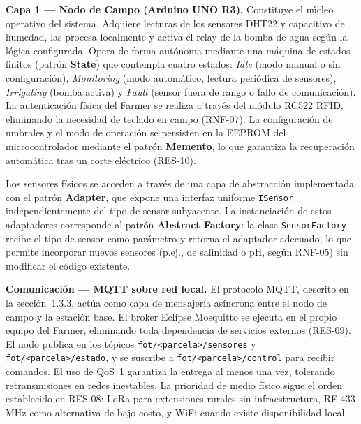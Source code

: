 \noindent\textbf{Capa 1 — Nodo de Campo (Arduino UNO R3).} Constituye el
núcleo operativo del sistema. Adquiere lecturas de los sensores DHT22 y
capacitivo de humedad, las procesa localmente y activa el relay de la bomba
de agua según la lógica configurada. Opera de forma autónoma mediante una
máquina de estados finitos (patrón \textbf{State}) que contempla cuatro
estados: \textit{Idle} (modo manual o sin configuración), \textit{Monitoring}
(modo automático, lectura periódica de sensores), \textit{Irrigating} (bomba
activa) y \textit{Fault} (sensor fuera de rango o fallo de comunicación).
La autenticación física del Farmer se realiza a través del módulo RC522
RFID, eliminando la necesidad de teclado en campo (RNF-07). La configuración
de umbrales y el modo de operación se persisten en la EEPROM del
microcontrolador mediante el patrón \textbf{Memento}, lo que garantiza la
recuperación automática tras un corte eléctrico (RES-10).

Los sensores físicos se acceden a través de una capa de abstracción
implementada con el patrón \textbf{Adapter}, que expone una interfaz uniforme
\texttt{ISensor} independientemente del tipo de sensor subyacente. La
instanciación de estos adaptadores corresponde al patrón \textbf{Abstract
Factory}: la clase \texttt{SensorFactory} recibe el tipo de sensor como
parámetro y retorna el adaptador adecuado, lo que permite incorporar nuevos
sensores (p.ej., de salinidad o pH, según RNF-05) sin modificar el código
existente.

\noindent\textbf{Comunicación — MQTT sobre red local.} El protocolo MQTT,
descrito en la sección~1.3.3, actúa como capa de mensajería asíncrona entre
el nodo de campo y la estación base. El broker Eclipse Mosquitto se ejecuta
en el propio equipo del Farmer, eliminando toda dependencia de servicios
externos (RES-09). El nodo publica en los tópicos
\texttt{fot/<parcela>/sensores} y \texttt{fot/<parcela>/estado}, y se
suscribe a \texttt{fot/<parcela>/control} para recibir comandos. El uso de
QoS~1 garantiza la entrega al menos una vez, tolerando retransmisiones en
redes inestables. La prioridad de medio físico sigue el orden establecido en
RES-08: LoRa para extensiones rurales sin infraestructura, RF 433\,MHz como
alternativa de bajo costo, y WiFi cuando existe disponibilidad local.

